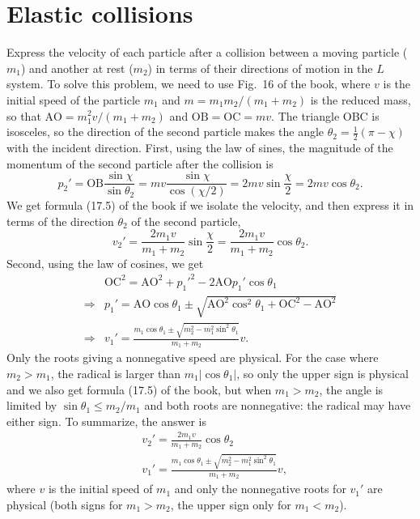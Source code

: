 \section{Elastic collisions}


\begin{problem}[title={Elastic collision with a particle at rest}]
{
Express the velocity of each particle after a collision between a moving particle ($m_1$) and another at rest ($m_2$) in terms of their directions of motion in the $L$ system.
}
{
To solve this problem, we need to use Fig.~16 of the book, where $v$ is the initial speed of the particle $m_1$ and $m = m_1m_2/(m_1+m_2)$ is the reduced mass, so that $\mathrm{AO} = m_1^2v/(m_1+m_2)$ and $\mathrm{OB} = \mathrm{OC} = mv$. The triangle OBC is isosceles, so the direction of the second particle makes the angle $\theta_2 = \frac{1}{2}(\pi-\chi)$ with the incident direction. First, using the law of sines, the magnitude of the momentum of the second particle after the collision is
\begin{equation*}
p_2' = \mathrm{OB}\frac{\sin{\chi}}{\sin{\theta_2}} = mv\frac{\sin{\chi}}{\cos{(\chi/2)}} = 2mv\sin{\frac{\chi}{2}} = 2mv\cos{\theta_2}.
\end{equation*}
We get formula (17.5) of the book if we isolate the velocity, and then express it in terms of the direction $\theta_2$ of the second particle,
\begin{equation*}
    v_2' = \frac{2m_1v}{m_1+m_2}\sin{\frac{\chi}{2}} = \frac{2m_1v}{m_1+m_2}\cos{\theta_2}.
\end{equation*}
Second, using the law of cosines, we get
\begin{align*}
    &\mathrm{OC}^2 = \mathrm{AO}^2 + p_1'^2 - 2\mathrm{AO}p_1'\cos{\theta_1} \\
    \Rightarrow &p_1' = \mathrm{AO}\cos{\theta_1} \pm \sqrt{\mathrm{AO}^2\cos^2{\theta_1} + \mathrm{OC}^2 - \mathrm{AO}^2} \\
    \Rightarrow &v_1' = \frac{m_1\cos{\theta_1} \pm \sqrt{m_2^2-m_1^2\sin^2{\theta_1}}}{m_1+m_2}v.
\end{align*}
Only the roots giving a nonnegative speed are physical. For the case where $m_2 > m_1$, the radical is larger than $m_1|\cos{\theta_1}|$, so only the upper sign is physical and we also get formula (17.5) of the book, but when $m_1 > m_2$, the angle is limited by $\sin{\theta_1} \leq m_2/m_1$ and both roots are nonnegative: the radical may have either sign. To summarize, the answer is
}
{
\begin{align*}
    &v_2' = \frac{2m_1v}{m_1+m_2}\cos{\theta_2} \\
    &v_1' = \frac{m_1\cos{\theta_1} \pm \sqrt{m_2^2-m_1^2\sin^2{\theta_1}}}{m_1+m_2}v,
\end{align*}
where $v$ is the initial speed of $m_1$ and only the nonnegative roots for $v_1'$ are physical (both signs for $m_1>m_2$, the upper sign only for $m_1<m_2$).
}
\end{problem}

